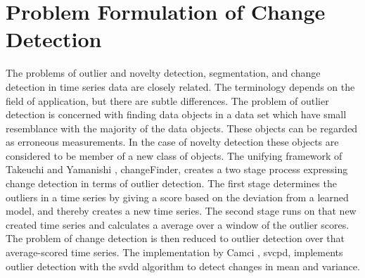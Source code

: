 \section{Problem Formulation of Change Detection}\label{sec:change_detection_time_series}

The problems of outlier and novelty detection, segmentation, and change detection in time series data are closely related.
The terminology depends on the field of application, but there are subtle differences.
The problem of outlier detection is concerned with finding data objects in a data set which have small resemblance with the majority of the data objects.
These objects can be regarded as erroneous measurements.
In the case of novelty detection these objects are considered to be member of a new class of objects.
The unifying framework of Takeuchi and Yamanishi \cite{takeuchi2006unifying}, \gls{changeFinder}, creates a two stage process expressing change detection in terms of outlier detection.
The first stage determines the outliers in a time series by giving a score based on the deviation from a learned model, and thereby creates a new time series.
The second stage runs on that new created time series and calculates a average over a window of the outlier scores.
The problem of change detection is then reduced to outlier detection over that average-scored time series.
The implementation by Camci \cite{camci2010change}, \gls{svcpd}, implements outlier detection with the \gls{svdd} algorithm to detect changes in mean and variance.

